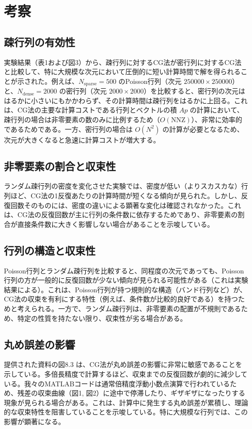 \documentclass{article}
\begin{document}
\section{考察}
\subsection{疎行列の有効性}
実験結果（表1および図3）から、疎行列に対するCG法が密行列に対するCG法と比較して、特に大規模な次元において圧倒的に短い計算時間で解を得られることが示された。例えば、$N_{\text{sparse}}=500$ のPoisson行列（次元 $250000 \times 250000$）と、$N_{\text{dense}}=2000$ の密行列（次元 $2000 \times 2000$）を比較すると、密行列の次元ははるかに小さいにもかかわらず、その計算時間は疎行列をはるかに上回る。これは、CG法の主要な計算コストである行列とベクトルの積 $Ap$ の計算において、疎行列の場合は非零要素の数のみに比例するため（$O(\text{NNZ})$）、非常に効率的であるためである。一方、密行列の場合は $O(N^2)$ の計算が必要となるため、次元が大きくなると急速に計算コストが増大する。

\subsection{非零要素の割合と収束性}
ランダム疎行列の密度を変化させた実験では、密度が低い（よりスカスカな）行列ほど、CG法の1反復あたりの計算時間が短くなる傾向が見られた。しかし、反復回数そのものには、密度の違いによる顕著な変化は確認されなかった。これは、CG法の反復回数が主に行列の条件数に依存するためであり、非零要素の割合が直接条件数に大きく影響しない場合があることを示唆している。

\subsection{行列の構造と収束性}
Poisson行列とランダム疎行列を比較すると、同程度の次元であっても、Poisson行列の方が一般的に反復回数が少ない傾向が見られる可能性がある（これは実験結果による）。これは、Poisson行列が持つ規則的な構造（バンド行列など）が、CG法の収束を有利にする特性（例えば、条件数が比較的良好である）を持つためと考えられる。一方で、ランダム疎行列は、非零要素の配置が不規則であるため、特定の性質を持たない限り、収束性が劣る場合がある。

\subsection{丸め誤差の影響}
提供された資料の図8.3 は、CG法が丸め誤差の影響に非常に敏感であることを示している。多倍長精度で計算するほど、収束までの反復回数が劇的に減少している。我々のMATLABコードは通常倍精度浮動小数点演算で行われているため、残差の収束曲線（図1, 図2）に途中で停滞したり、ギザギザになったりする現象が見られる場合がある。これは、計算中に発生する丸め誤差が累積し、理論的な収束特性を阻害していることを示唆している。特に大規模な行列では、この影響が顕著になる。
\end{document}
